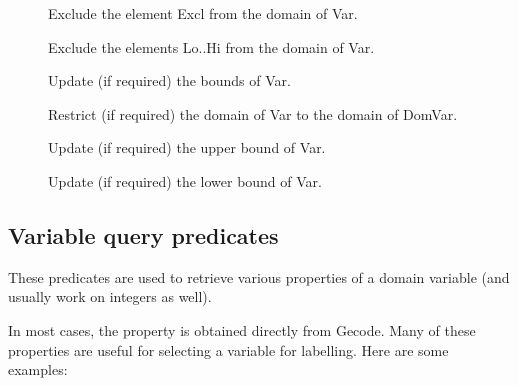 \begin{description}
\item[]
Exclude the element Excl from the domain of Var.

\item[]
Exclude the elements Lo..Hi from the domain of Var.

\item[]
Update (if required) the bounds of Var.

\item[]
Restrict (if required) the domain of Var to the domain of DomVar.

\item[]
Update (if required) the upper bound of Var.

\item[]
Update (if required) the lower bound of Var.

\end{description}


\subsection{Variable query predicates}
\label{gfdvarquery}

These predicates are used to retrieve various properties of a domain variable 
(and usually work on integers as well). 

In most cases, the property is obtained directly from Gecode. Many of these
properties are useful for selecting a variable for labelling. Here are some
examples:

